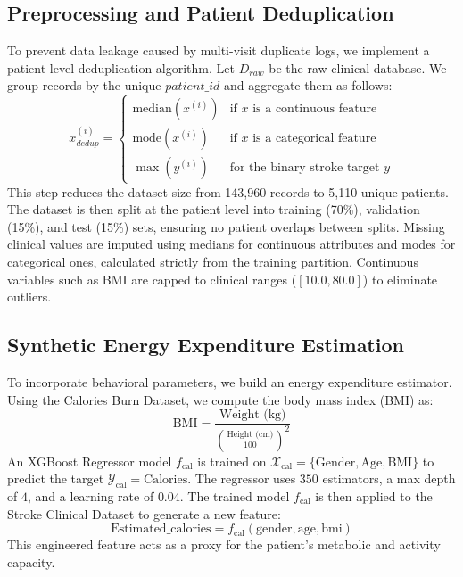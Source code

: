 \documentclass[11pt,letterpaper]{article}
\begin{document}
\subsection{Preprocessing and Patient Deduplication}
To prevent data leakage caused by multi-visit duplicate logs, we implement a patient-level deduplication algorithm. Let $D_{raw}$ be the raw clinical database. We group records by the unique $patient\_id$ and aggregate them as follows:
\begin{equation}
x_{dedup}^{(i)} = 
\begin{cases}
\text{median}(x^{(i)}) & \text{if } x \text{ is a continuous feature} \\
\text{mode}(x^{(i)}) & \text{if } x \text{ is a categorical feature} \\
\max(y^{(i)}) & \text{for the binary stroke target } y
\end{cases}
\end{equation}
This step reduces the dataset size from 143,960 records to 5,110 unique patients. The dataset is then split at the patient level into training (70\%), validation (15\%), and test (15\%) sets, ensuring no patient overlaps between splits. Missing clinical values are imputed using medians for continuous attributes and modes for categorical ones, calculated strictly from the training partition. Continuous variables such as BMI are capped to clinical ranges ($[10.0, 80.0]$) to eliminate outliers.

\subsection{Synthetic Energy Expenditure Estimation}
To incorporate behavioral parameters, we build an energy expenditure estimator. Using the Calories Burn Dataset, we compute the body mass index (BMI) as:
\begin{equation}
\text{BMI} = \frac{\text{Weight (kg)}}{\left(\frac{\text{Height (cm)}}{100}\right)^2}
\end{equation}
An XGBoost Regressor model $f_{\text{cal}}$ is trained on $\mathcal{X}_{\text{cal}} = \{\text{Gender}, \text{Age}, \text{BMI}\}$ to predict the target $\mathcal{Y}_{\text{cal}} = \text{Calories}$. The regressor uses $350$ estimators, a max depth of $4$, and a learning rate of $0.04$. The trained model $f_{\text{cal}}$ is then applied to the Stroke Clinical Dataset to generate a new feature:
\begin{equation}
\text{Estimated\_calories} = f_{\text{cal}}(\text{gender}, \text{age}, \text{bmi})
\end{equation}
This engineered feature acts as a proxy for the patient's metabolic and activity capacity.
\end{document}
